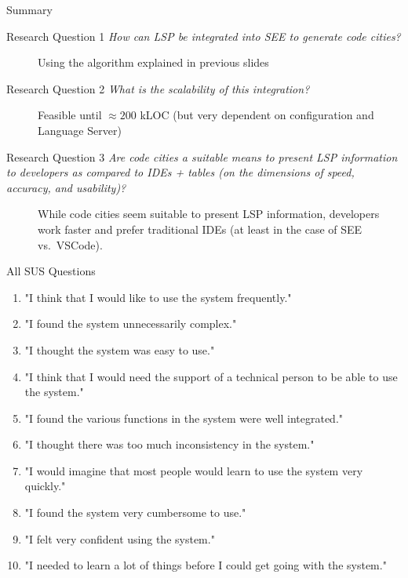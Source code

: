\documentclass[xcolor={dvipsnames},aspectratio=169,compress,final]{beamer}
\newcommand{\follows}{\raisebox{-0.7mm}{\scalebox{1.4}{\textcolor{Maroon}{\ding{43}}}}}
\newcommand{\answer}[1]{\begin{description}\item[\follows{}]{#1}\end{description}}
\begin{document}
\begin{frame}{Summary}

	\begin{alertblock}{Research Question 1}
		\emph{How can LSP be integrated into SEE to generate code cities?}
		\answer{\small Using the algorithm explained in previous slides}
	\end{alertblock}

	\begin{exampleblock}{Research Question 2}
		\emph{What is the scalability of this integration?}
		\answer{\small Feasible until $\approx 200$ kLOC (but very dependent on configuration and Language Server)}
	\end{exampleblock}

	\begin{block}{Research Question 3}
		\emph{Are code cities a suitable means to present LSP information to developers as compared to IDEs + tables (on the dimensions of speed, accuracy, and usability)?}
		\answer{While code cities seem suitable to present LSP information, developers work faster and prefer traditional IDEs (at least in the case of SEE vs.\ VSCode).}
	\end{block}
\end{frame}

\begin{frame}{All SUS Questions}
	\begin{enumerate}
		\item "I think that I would like to use the system frequently."
		\item "I found the system unnecessarily complex."
		\item "I thought the system was easy to use."
		\item "I think that I would need the support of a technical person to be able to use the system."
		\item "I found the various functions in the system were well integrated."
		\item "I thought there was too much inconsistency in the system."
		\item "I would imagine that most people would learn to use the system very quickly."
		\item "I found the system very cumbersome to use."
		\item "I felt very confident using the system."
		\item "I needed to learn a lot of things before I could get going with the system."
	\end{enumerate}
\end{frame}
\end{document}
